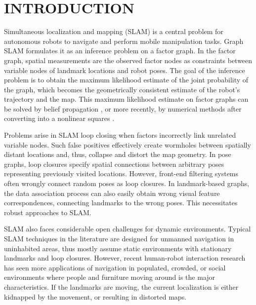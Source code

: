 \section{INTRODUCTION}

Simultaneous localization and mapping (SLAM) is a central problem for
autonomous robots to navigate and perform mobile manipulation tasks. %
Graph SLAM formulates it as an inference problem
on a factor graph. In the factor graph, spatial measurements are the observed factor nodes as constraints between variable nodes of landmark locations and robot poses. The goal of
the inference problem is to obtain the maximum likelihood estimate of the
joint probability of the graph, which becomes the geometrically consistent
estimate of the robot's trajectory and the map. This maximum likelihood estimate on factor graphs can be solved by belief propagation , or more recently, by numerical methods after converting into a nonlinear squares \cite{isam,g2o,olson2006fast}. %

Problems arise in SLAM loop closing when factors incorrectly link unrelated variable nodes.  Such false positives effectively create wormholes between spatially distant locations and, thus, collapse and distort the map geometry. In pose graphs, loop closures specify spatial connections between arbitrary poses representing previously visited locations.  However, front-end filtering systems  often wrongly connect random poses as loop closures.  In landmark-based graphs, the data association process can also easily obtain wrong visual feature correspondences, connecting landmarks to the wrong poses. This necessitates robust approaches to SLAM.

SLAM also faces considerable open challenges for dynamic environments.
Typical SLAM techniques in the literature are designed for unmanned navigation
in uninhabited areas, thus mostly assume static environments with stationary
landmarks and loop closures. However, recent human-robot interaction research
has seen more applications of navigation in populated, crowded, or social
environments where people and furniture moving around is the major
characteristics. If the landmarks are moving, the current localization is either
kidnapped by the movement, or resulting in distorted maps.


